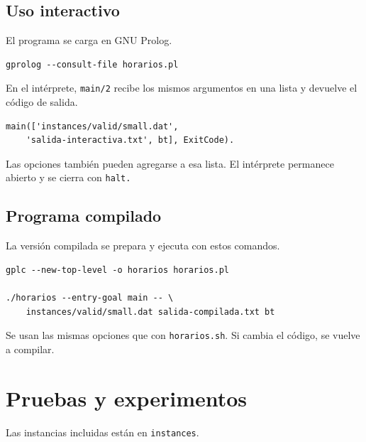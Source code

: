\documentclass[11pt,a4paper]{article}
\begin{document}
\subsection{Uso interactivo}

El programa se carga en GNU Prolog.

\begin{lstlisting}
gprolog --consult-file horarios.pl
\end{lstlisting}

En el intérprete, \texttt{main/2} recibe los mismos argumentos en una lista y devuelve el código de salida.

\begin{lstlisting}
main(['instances/valid/small.dat',
    'salida-interactiva.txt', bt], ExitCode).
\end{lstlisting}

Las opciones también pueden agregarse a esa lista. El intérprete permanece abierto y se cierra con \texttt{halt.}

\subsection{Programa compilado}

La versión compilada se prepara y ejecuta con estos comandos.

\begin{lstlisting}
gplc --new-top-level -o horarios horarios.pl

./horarios --entry-goal main -- \
    instances/valid/small.dat salida-compilada.txt bt
\end{lstlisting}

Se usan las mismas opciones que con \texttt{horarios.sh}. Si cambia el código, se vuelve a compilar.

\section{Pruebas y experimentos}

Las instancias incluidas están en \texttt{instances}.
\end{document}
